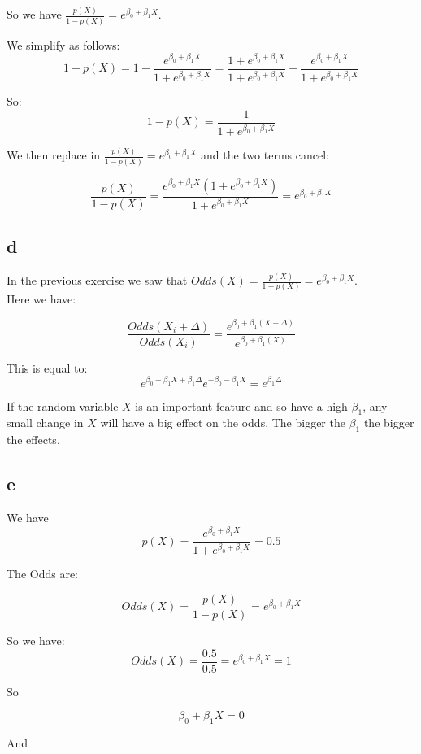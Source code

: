 So we have $\frac{p(X)}{1 - p(X)} = e^{\beta_0 + \beta_1 X} $.

We simplify as follows:
\[ 1 - p(X) = 1 - \frac{e^{\beta_0 + \beta_1 X}}{1 + e^{\beta_0 + \beta_1 X}} = \frac{1 + e^{\beta_0 + \beta_1 X}}{1 + e^{\beta_0 + \beta_1 X}} - \frac{e^{\beta_0 + \beta_1 X}}{1 + e^{\beta_0 + \beta_1 X}}\]

So: 
\[ 1 - p(X) = \frac{1}{1 + e^{\beta_0 + \beta_1 X}} \]

We then replace in $\frac{p(X)}{1 - p(X)} = e^{\beta_0 + \beta_1 X}  $ and the two terms cancel:

\[ \frac{p(X)}{1 - p(X)} = \frac{e^{\beta_0 + \beta_1 X} (1 + e^{\beta_0 + \beta_1 X} )}{1 + e^{\beta_0 + \beta_1 X}} = e^{\beta_0 + \beta_1 X}  \]


\subsection*{d}

In the previous exercise we saw that $Odds(X) = \frac{p(X)}{1 - p(X)} = e^{\beta_0 + \beta_1 X} $.\\


Here we have: 

\[ \frac{Odds(X_i + \Delta)}{Odds(X_i)} = \frac{e^{\beta_0 + \beta_1 (X + \Delta)}}{e^{\beta_0 + \beta_1 (X)}} \]

This is equal to: 
\[ e^{\beta_0 + \beta_1 X + \beta_1 \Delta}  e^{-\beta_0 - \beta_1 X} = e^{\beta_1 \Delta} \]

If the random variable $X$ is an important feature and so have a high $\beta_1$, any small change in $X$ will have a big effect on the odds. The bigger the $\beta_1$ the bigger the effects. 

\subsection*{e}



We have 
\[  p(X) = \frac{e^{\beta_0 + \beta_1 X}}{1 + e^{\beta_0 + \beta_1 X}} = 0.5 \]

The Odds are: 

\[ Odds(X) = \frac{p(X)}{1 - p(X)} = e^{\beta_0 + \beta_1 X}  \]

So we have: 
\[ Odds(X) = \frac{0.5}{0.5} = e^{\beta_0 + \beta_1 X} = 1 \]

So

\[ \beta_0 + \beta_1 X = 0 \]

And

